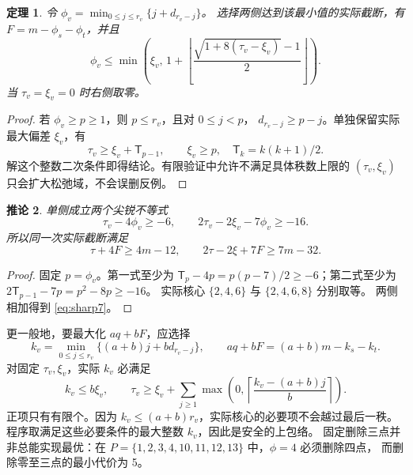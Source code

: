 \documentclass[11pt,a4paper]{article}
\newcommand{\T}{\mathsf T}
\newtheorem{theorem}{定理}[section]
\newtheorem{corollary}[theorem]{推论}
\begin{document}
\begin{theorem}\label{thm:phi}
令 $\phi_v=\min_{0\le j\le r_v}\{j+d_{r_v-j}\}$。
选择两侧达到该最小值的实际截断，有 $F=m-\phi_s-\phi_t$，并且
\[
\phi_v\le \min\left(\xi_v,\,
1+\left\lfloor\frac{\sqrt{1+8(\tau_v-\xi_v)}-1}{2}\right\rfloor\right).
\]
当 $\tau_v=\xi_v=0$ 时右侧取零。
\end{theorem}
\begin{proof}
若 $\phi_v\ge p\ge1$，则 $p\le r_v$，且对 $0\le j<p$，
$d_{r_v-j}\ge p-j$。单独保留实际最大偏差 $\xi_v$，有
\[\tau_v\ge \xi_v+\T_{p-1},\qquad \xi_v\ge p,
\quad\T_k=k(k+1)/2.\]
解这个整数二次条件即得结论。有限验证中允许不满足具体秩数上限的
$(\tau_v,\xi_v)$ 只会扩大松弛域，不会误删反例。
\end{proof}

\begin{corollary}\label{cor:sharp}
单侧成立两个尖锐不等式
\[\tau_v-4\phi_v\ge-6,\qquad
2\tau_v-2\xi_v-7\phi_v\ge-16.\]
所以同一次实际截断满足
\begin{equation}\label{eq:sharp7}
\tau+4F\ge4m-12,\qquad
2\tau-2\xi+7F\ge7m-32.
\end{equation}
\end{corollary}
\begin{proof}
固定 $p=\phi_v$。第一式至少为
$\T_p-4p=p(p-7)/2\ge-6$；第二式至少为
$2\T_{p-1}-7p=p^2-8p\ge-16$。
实际核心 $\{2,4,6\}$ 与 $\{2,4,6,8\}$ 分别取等。
两侧相加得到 \eqref{eq:sharp7}。
\end{proof}

更一般地，要最大化 $a q+bF$，应选择
\[
k_v=\min_{0\le j\le r_v}\{(a+b)j+b d_{r_v-j}\},\qquad
 aq+bF=(a+b)m-k_s-k_t.
\]
对固定 $\tau_v,\xi_v$，实际 $k_v$ 必满足
\begin{equation}\label{eq:weighted-inverse}
k_v\le b\xi_v,\qquad
\tau_v\ge\xi_v+
\sum_{j\ge1}\max\left(0,\left\lceil\frac{k_v-(a+b)j}{b}\right\rceil\right).
\end{equation}
正项只有有限个。因为 $k_v\le(a+b)r_v$，实际核心的必要项不会越过最后一秩。
程序取满足这些必要条件的最大整数 $k_v$，因此是安全的上包络。
固定删除三点并非总能实现最优：在
$P=\{1,2,3,4,10,11,12,13\}$ 中，$\phi=4$ 必须删除四点，
而删除零至三点的最小代价为 5。
\end{document}
